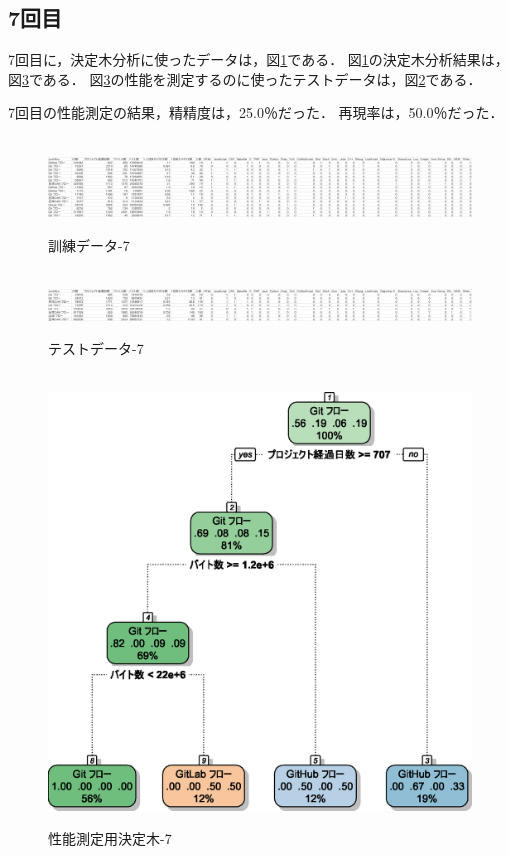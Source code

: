 \subsection{7回目}
7回目に，決定木分析に使ったデータは，図\ref{データ7-1}である．
図\ref{データ7-1}の決定木分析結果は，図\ref{決定木7}である．
図\ref{決定木7}の性能を測定するのに使ったテストデータは，図\ref{データ7-2}である．

7回目の性能測定の結果，精精度は，25.0％だった．
再現率は，50.0％だった．

\begin{figure}[H]
\centering　
\includegraphics[width=13cm]{7-1.png}
\caption{訓練データ-7}\label{データ7-1}
\end{figure}
\begin{figure}[H]
\centering　
\includegraphics[width=13cm]{7-2.png}
\caption{テストデータ-7}\label{データ7-2}
\end{figure}
\begin{figure}[H]
\centering　
\includegraphics[width=13cm]{7.eps}
\caption{性能測定用決定木-7}\label{決定木7}
\end{figure}


